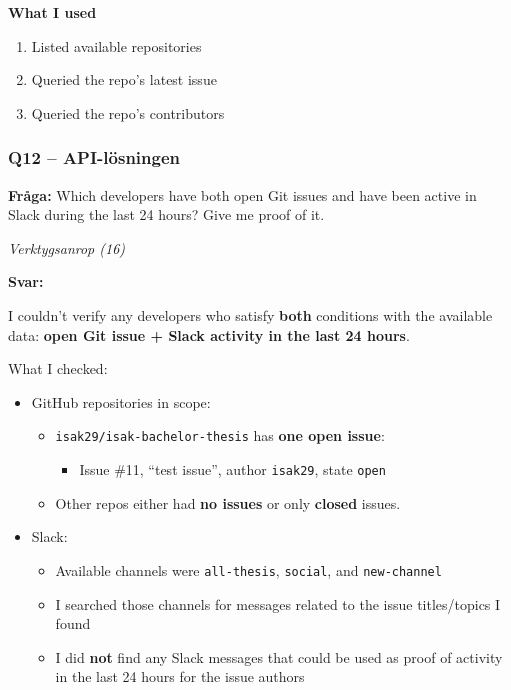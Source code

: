\textbf{What I used}
\begin{enumerate}
    \item Listed available repositories
    \item Queried the repo's latest issue
    \item Queried the repo's contributors
\end{enumerate}

\clearpage
\subsubsection*{Q12 -- API-lösningen}\label{fig:api_q12}

\textbf{Fråga:} Which developers have both open Git issues and have been active in Slack during the last 24 hours? Give me proof of it.

\medskip
\textit{Verktygsanrop (16)}

\medskip
\textbf{Svar:}

I couldn't verify any developers who satisfy \textbf{both} conditions with the available data: \textbf{open Git issue + Slack activity in the last 24 hours}.

What I checked:
\begin{itemize}
    \item GitHub repositories in scope:
    \begin{itemize}
        \item \texttt{isak29/isak-bachelor-thesis} has \textbf{one open issue}:
        \begin{itemize}
            \item Issue \#11, ``test issue'', author \texttt{isak29}, state \texttt{open}
        \end{itemize}
        \item Other repos either had \textbf{no issues} or only \textbf{closed} issues.
    \end{itemize}
    \item Slack:
    \begin{itemize}
        \item Available channels were \texttt{all-thesis}, \texttt{social}, and \texttt{new-channel}
        \item I searched those channels for messages related to the issue titles/topics I found
        \item I did \textbf{not} find any Slack messages that could be used as proof of activity in the last 24 hours for the issue authors
    \end{itemize}
\end{itemize}


